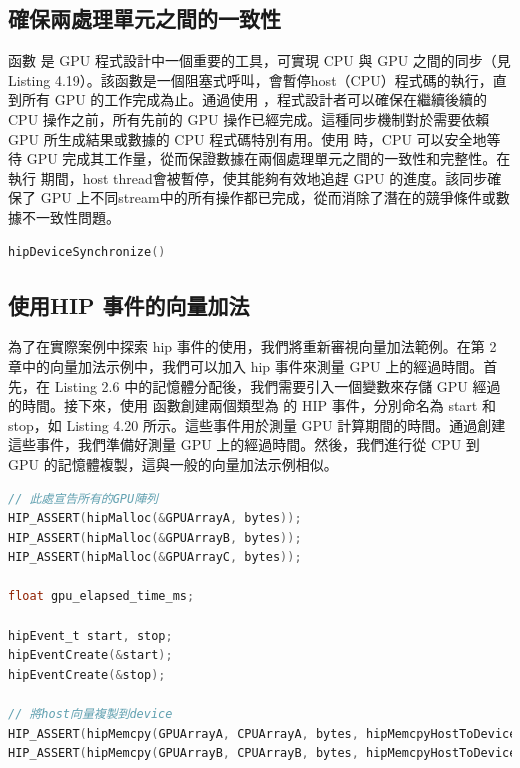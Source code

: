 \subsection{確保兩處理單元之間的一致性}
函數  是 GPU 程式設計中一個重要的工具，可實現 CPU 與 GPU 之間的同步（見 Listing 4.19）。該函數是一個阻塞式呼叫，會暫停host（CPU）程式碼的執行，直到所有 GPU 的工作完成為止。通過使用 ，程式設計者可以確保在繼續後續的 CPU 操作之前，所有先前的 GPU 操作已經完成。這種同步機制對於需要依賴 GPU 所生成結果或數據的 CPU 程式碼特別有用。使用  時，CPU 可以安全地等待 GPU 完成其工作量，從而保證數據在兩個處理單元之間的一致性和完整性。在執行  期間，host thread會被暫停，使其能夠有效地追趕 GPU 的進度。該同步確保了 GPU 上不同stream中的所有操作都已完成，從而消除了潛在的競爭條件或數據不一致性問題。

\begin{lstlisting}[language=C, caption={使用 hipDeviceSynchronize()
確保兩個處理單元之間的一致性}, label={19th:example}]
hipDeviceSynchronize()
\end{lstlisting}

\subsection{使用HIP 事件的向量加法}
為了在實際案例中探索 hip 事件的使用，我們將重新審視向量加法範例。在第 2 章中的向量加法示例中，我們可以加入 hip 事件來測量 GPU 上的經過時間。首先，在 Listing 2.6 中的記憶體分配後，我們需要引入一個變數來存儲 GPU 經過的時間。接下來，使用  函數創建兩個類型為  的 HIP 事件，分別命名為 start 和 stop，如 Listing 4.20 所示。這些事件用於測量 GPU 計算期間的時間。通過創建這些事件，我們準備好測量 GPU 上的經過時間。然後，我們進行從 CPU 到 GPU 的記憶體複製，這與一般的向量加法示例相似。

\begin{lstlisting}[language=C, caption={GPU的記憶體配置與CPU到GPU的記憶體複製}, label={20th:example}]
// 此處宣告所有的GPU陣列
HIP_ASSERT(hipMalloc(&GPUArrayA, bytes));
HIP_ASSERT(hipMalloc(&GPUArrayB, bytes));
HIP_ASSERT(hipMalloc(&GPUArrayC, bytes));

float gpu_elapsed_time_ms;

hipEvent_t start, stop;
hipEventCreate(&start);
hipEventCreate(&stop);

// 將host向量複製到device
HIP_ASSERT(hipMemcpy(GPUArrayA, CPUArrayA, bytes, hipMemcpyHostToDevice));
HIP_ASSERT(hipMemcpy(GPUArrayB, CPUArrayB, bytes, hipMemcpyHostToDevice));
\end{lstlisting}

